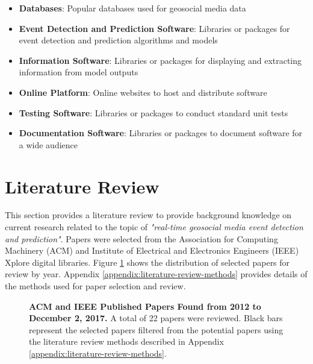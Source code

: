 \begin{itemize}
	\item \textbf{Databases}: Popular databases used for geosocial media data
	\item \textbf{Event Detection and Prediction Software}: Libraries or packages for event detection and prediction algorithms and models
	\item \textbf{Information Software}: Libraries or packages for displaying and extracting information from model outputs
	\item \textbf{Online Platform}: Online websites to host and distribute software
	\item \textbf{Testing Software}: Libraries or packages to conduct standard unit tests
	\item \textbf{Documentation Software}: Libraries or packages to document software for a wide audience
\end{itemize}




\section{Literature Review} \label{literature-review}

This section provides a literature review to provide background knowledge on current research related to the topic of \textit{"real-time geosocial media event detection and prediction"}. Papers were selected from the Association for Computing Machinery (ACM) and Institute of Electrical and Electronics Engineers (IEEE) Xplore digital libraries. Figure \ref{figure:papers_yearly} shows  the distribution of selected papers for review by year. Appendix \ref{appendix:literature-review-methods} provides details of the methods used for paper selection and review.

\begin{figure}[!htb]
\begin{center}
\caption{\textbf{ACM and IEEE Published Papers Found from 2012 to December 2, 2017.} A total of 22 papers were reviewed. Black bars represent the selected papers filtered from the potential papers using the literature review methods described in Appendix \ref{appendix:literature-review-methods}.}
\label{figure:papers_yearly}
\end{center}
\end{figure}

